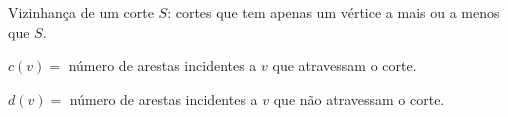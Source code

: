 Vizinhança de um corte $S$: cortes que tem apenas um vértice a mais ou a menos que $S$.

$c(v) = $ número de arestas incidentes a $v$ que atravessam o corte.

$d(v) = $ número de arestas incidentes a $v$ que não atravessam o corte.

\begin{algorithm}
\SetAlgoLined
{}

\end{algorithm}

